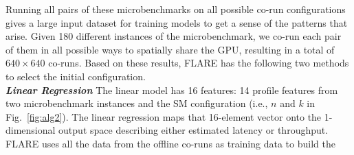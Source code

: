         Running all pairs of these microbenchmarks on all possible co-run configurations gives a large input dataset for training models 
        to get a sense of the patterns that arise. %
		Given 180 different instances of the microbenchmark, we co-run each pair of them 
        in all possible ways to spatially share the GPU, resulting in a total of $640 \times 640 $ co-runs. 
        Based on these results, FLARE has the following two methods to select the initial configuration. \\
\textbf{\textit{Linear Regression}} %
The linear model has 16 features: 14 profile features from two
microbenchmark instances and the SM configuration (i.e., $n$ and $k$ in Fig.~\ref{fig:alg2}). 
The linear regression maps that 16-element vector onto the
1-dimensional output space describing either estimated latency or throughput.
FLARE uses all the data from the offline co-runs as training data to build the

